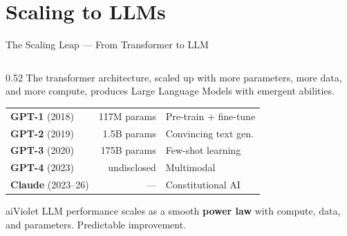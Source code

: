 \section{Scaling to LLMs}

\begin{frame}[shrink=2]{The Scaling Leap --- From Transformer to LLM}

  \begin{columns}[T]
    \begin{column}{0.52\textwidth}
      {\small The transformer architecture, scaled up with more parameters,
      more data, and more compute, produces Large Language Models with
      emergent abilities.}

      \vspace{0.3em}

      \begin{tcolorbox}[colback=aiViolet!5,colframe=aiViolet,
        fonttitle=\bfseries\small,title={The GPT Series},
        rounded corners,boxrule=0.8pt,left=3pt,right=3pt,top=3pt,bottom=3pt]
        \scriptsize
        \begin{tabular}{@{}lrl@{}}
          \textbf{GPT-1} (2018) & 117M params & Pre-train + fine-tune\\
          \textbf{GPT-2} (2019) & 1.5B params & Convincing text gen.\\
          \textbf{GPT-3} (2020) & 175B params & Few-shot learning\\
          \textbf{GPT-4} (2023) & undisclosed & Multimodal\\
          \textbf{Claude} (2023--26) & --- & Constitutional AI
        \end{tabular}
      \end{tcolorbox}

      \vspace{0.3em}

      \begin{personbox}{aiViolet}
        \scriptsize LLM performance scales as a smooth \textbf{power law}
        with compute, data, and parameters. Predictable improvement.
      \end{personbox}
    \end{column}


\end{columns}
\end{frame}
